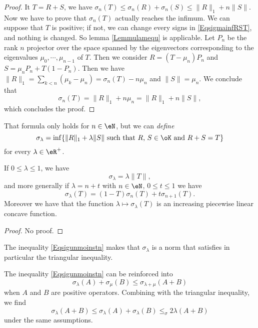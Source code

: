 \begin{proof}
It $T=R+S$, we have $\sigma_n(T)\leq\sigma_n(R)+\sigma_n(S)\leq \| R \|_1+n\| S \|$. Now we have to prove that $\sigma_n(T)$ actually reaches the infimum.  We can suppose that $T$ is positive; if not, we can change every signs in \eqref{EqsigmainfRST}, and nothing is changed. So lemma \ref{Lemmulamequ} is applicable. Let $P_n$ be the rank $n$ projector over the space spanned by the eigenvectors corresponding to the eigenvalues $\mu_0,\cdots,\mu_{n-1}$ of $T$. Then we consider $R=(T-\mu_n)P_n$ and $S=\mu_nP_n+T(1-P_n)$. Then we have $\| R \|_1=\sum_{k<n}(\mu_k-\mu_n)=\sigma_n(T)-n\mu_n$ and $\| S \|=\mu_n$. We conclude that
\[ 
  \sigma_n(T)=\| R \|_1+n\mu_n=\| R \|_1+n\| S \|,
\]
which concludes the proof.
\end{proof}
That formula only holds for $n\in\eN$, but we can \emph{define}
\begin{equation}
\sigma_{\lambda}=\inf\{ \| R \|_1+\lambda\| S \|\text{ such that $R$, $S\in\oK$ and $R+S=T$} \}
\end{equation}
for every $\lambda\in\eR^{+}$.

\begin{proposition}
If $0\leq\lambda\leq 1$, we have
\[ 
  \sigma_{\lambda}=\lambda\| T \|,
\]
and more generally if $\lambda=n+t$ with $n\in\eN$, $0\leq t\leq 1$ we have
\begin{equation}	\label{Eqsigunmoinstn}
\sigma_{\lambda}(T)=(1-T)\sigma_n(T)+t\sigma_{n+1}(T).
\end{equation}
Moreover we have that the function $\lambda\mapsto\sigma_{\lambda}(T)$ is an increasing piecewise linear concave function.
\end{proposition}
\begin{proof}
No proof.
\end{proof}
The inequality \eqref{Eqsigunmoinstn} makes that $\sigma_{\lambda}$ is a norm that satisfies in particular the triangular inequality.

\begin{proposition}
The inequality \eqref{Eqsigunmoinstn} can be reinforced into
\begin{equation}
\sigma_{\lambda}(A)+\sigma_{\mu}(B)\leq \sigma_{\lambda+\mu}(A+B)
\end{equation}
when $A$ and $B$ are positive operators. Combining with the triangular inequality, we find
\begin{equation}
\sigma_{\lambda}(A+B)\leq\sigma_{\lambda}(A)+\sigma_{\lambda}(B)\leq_\sigma{2\lambda}(A+B)
\end{equation}
under the same assumptions.
\end{proposition}

